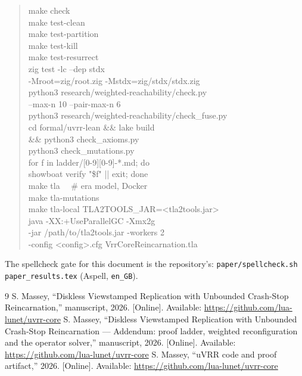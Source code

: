 \documentclass[10pt,journal,letterpaper]{IEEEtran}
\newcommand{\code}[1]{\texttt{#1}}
\begin{document}
\begin{quote}\raggedright\ttfamily\footnotesize
make check\\
make test-clean\\
make test-partition\\
make test-kill\\
make test-resurrect\\[4pt]
zig test -lc --dep stdx\\
\hspace*{2em}-Mroot=zig/root.zig -Mstdx=zig/stdx/stdx.zig\\[4pt]
python3 research/weighted-reachability/check.py\\
\hspace*{2em}--max-n 10 --pair-max-n 6\\
python3 research/weighted-reachability/check\_fuse.py\\[4pt]
cd formal/uvrr-lean \&\& lake build\\
\hspace*{2em}\&\& python3 check\_axioms.py\\
python3 check\_mutations.py\\
for f in ladder/[0-9][0-9]-*.md; do\\
\hspace*{2em}showboat verify "\$f" || exit; done\\[4pt]
make tla \ \ \# era model, Docker\\
make tla-mutations\\
make tla-local TLA2TOOLS\_JAR=<tla2tools.jar>\\
java -XX:+UseParallelGC -Xmx2g\\
\hspace*{2em}-jar /path/to/tla2tools.jar -workers 2\\
\hspace*{2em}-config <config>.cfg VrrCoreReincarnation.tla
\end{quote}

The spellcheck gate for this document is the repository's:
\code{paper/spellcheck.sh paper\_results.tex} (Aspell, \code{en\_GB}).

\begin{thebibliography}{9}
 S. Massey, ``Diskless Viewstamped Replication with Unbounded Crash-Stop Reincarnation,'' manuscript, 2026. [Online]. Available: \url{https://github.com/lua-lunet/uvrr-core}
 S. Massey, ``Diskless Viewstamped Replication with Unbounded Crash-Stop Reincarnation --- Addendum: proof ladder, weighted reconfiguration and the operator solver,'' manuscript, 2026. [Online]. Available: \url{https://github.com/lua-lunet/uvrr-core}
 S. Massey, ``uVRR code and proof artifact,'' 2026. [Online]. Available: \url{https://github.com/lua-lunet/uvrr-core}
\end{thebibliography}
\end{document}
